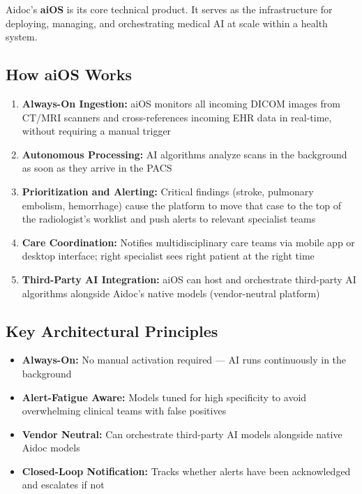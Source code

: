 \documentclass[12pt,a4paper]{article}
\begin{document}
Aidoc's \textbf{aiOS\texttrademark} is its core technical product. It serves as the infrastructure for deploying, managing, and orchestrating medical AI at scale within a health system.

\subsection{How aiOS Works}

\begin{enumerate}
    \item \textbf{Always-On Ingestion:} aiOS monitors all incoming DICOM images from CT/MRI scanners and cross-references incoming EHR data in real-time, without requiring a manual trigger
    \item \textbf{Autonomous Processing:} AI algorithms analyze scans in the background as soon as they arrive in the PACS
    \item \textbf{Prioritization and Alerting:} Critical findings (stroke, pulmonary embolism, hemorrhage) cause the platform to move that case to the top of the radiologist's worklist and push alerts to relevant specialist teams
    \item \textbf{Care Coordination:} Notifies multidisciplinary care teams via mobile app or desktop interface; right specialist sees right patient at the right time
    \item \textbf{Third-Party AI Integration:} aiOS can host and orchestrate third-party AI algorithms alongside Aidoc's native models (vendor-neutral platform)
\end{enumerate}

\subsection{Key Architectural Principles}

\begin{itemize}[noitemsep]
    \item \textbf{Always-On:} No manual activation required --- AI runs continuously in the background
    \item \textbf{Alert-Fatigue Aware:} Models tuned for high specificity to avoid overwhelming clinical teams with false positives
    \item \textbf{Vendor Neutral:} Can orchestrate third-party AI models alongside native Aidoc models
    \item \textbf{Closed-Loop Notification:} Tracks whether alerts have been acknowledged and escalates if not
\end{itemize}
\end{document}
